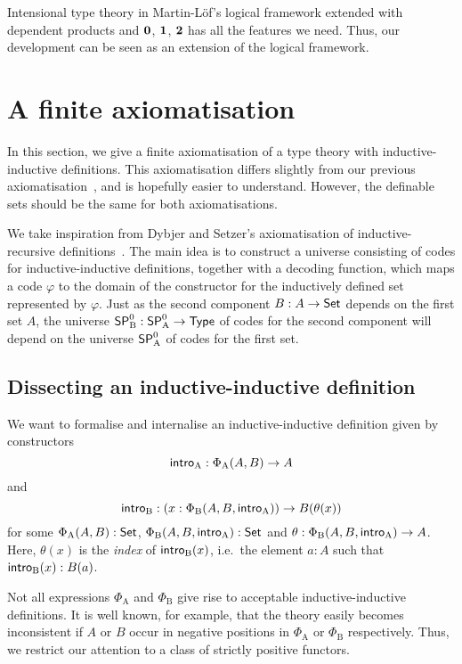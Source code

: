 \documentclass{article}
\begin{document}
Intensional type theory in Martin-L\"of's logical framework extended with
dependent products and $\mathbf{0}$, $\mathbf{1}$, $\mathbf{2}$
 has all the features we
need. Thus, our development can be seen as an extension of
the logical framework.

\section{A finite axiomatisation}
\label{sec:axiomatisation}
 

In this section, we give a finite axiomatisation of a type theory with
inductive-inductive definitions. This axiomatisation differs slightly
from our previous
axiomatisation~\cite{nordvallforsbergSetzer2010indind}, and is
hopefully easier to understand. However, the definable sets should
be the same for both axiomatisations.


We take inspiration from Dybjer and Setzer's axiomatisation of
inductive-recursive definitions~\cite{dybjersetzer1999finax}. The main
idea is to construct a universe consisting of codes for
inductive-inductive definitions, together with a decoding function,
which maps a code $\varphi$ to the domain of the constructor for the
inductively defined set represented by $\varphi$.  Just as the second
component $B : A \to \mathsf{Set}$ depends on the first set $A$, the universe $\mathsf{SP}^{0}_{\mathrm{B}} : \mathsf{SP}^{0}_{\mathrm{A}} \to \mathsf{Type}$
of codes for the second component will depend on the universe $\mathsf{SP}^{0}_{\mathrm{A}}$ of codes
for the first set.

\subsection{Dissecting an inductive-inductive definition}
\label{sec:dissect-ind}

We want to formalise and internalise an inductive-inductive definition
given by constructors
\[
\mathsf{intro}_{\mathrm{A}} : \Phi_{\mathrm{A}}(A, B) \to A
\]
and
\[
\mathsf{intro}_{\mathrm{B}} : (x : \Phi_{\mathrm{B}}(A, B, \mathsf{intro}_{\mathrm{A}})) \to B(\theta(x))
\]
for some $\Phi_{\mathrm{A}}(A, B) : \mathsf{Set}$, $\Phi_{\mathrm{B}}(A, B,
\mathsf{intro}_{\mathrm{A}}) : \mathsf{Set}$ and $\theta : \Phi_{\mathrm{B}}(A, B, \mathsf{intro}_{\mathrm{A}}) \to
A$.
Here, $\theta(x)$ is the \emph{index} of $\mathsf{intro}_{\mathrm{B}}(x)$, i.e.\ the element $a :
A$ such that $\mathsf{intro}_{\mathrm{B}}(x) : B(a)$.

Not all expressions $\Phi_{\mathrm{A}}$ and $\Phi_{\mathrm{B}}$ give
rise to acceptable inductive-inductive definitions. It is well known,
for example, that the theory easily becomes inconsistent if $A$ or $B$ occur
in negative positions in $\Phi_{\mathrm{A}}$ or $\Phi_{\mathrm{B}}$
respectively. Thus, we restrict our attention to a class of strictly
positive functors.
\end{document}
